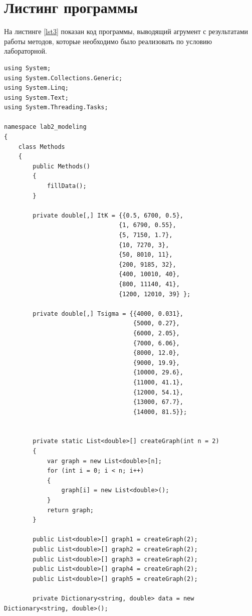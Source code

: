 \chapter{Листинг программы}

На листинге \ref{lst3} показан код программы, выводящий агрумент с результатами работы методов, которые необходимо было реализовать по условию лабораторной.

\begin{lstlisting}[caption=код программы, label=lst1]
using System;
using System.Collections.Generic;
using System.Linq;
using System.Text;
using System.Threading.Tasks;

namespace lab2_modeling
{
    class Methods
    {
        public Methods()
        {
            fillData();
        }

        private double[,] ItK = {{0.5, 6700, 0.5},
                                {1, 6790, 0.55},
                                {5, 7150, 1.7},
                                {10, 7270, 3},
                                {50, 8010, 11},
                                {200, 9185, 32},
                                {400, 10010, 40},
                                {800, 11140, 41},
                                {1200, 12010, 39} };

        private double[,] Tsigma = {{4000, 0.031},
                                    {5000, 0.27},
                                    {6000, 2.05},
                                    {7000, 6.06},
                                    {8000, 12.0},
                                    {9000, 19.9},
                                    {10000, 29.6},
                                    {11000, 41.1},
                                    {12000, 54.1},
                                    {13000, 67.7},
                                    {14000, 81.5}};

        
        private static List<double>[] createGraph(int n = 2)
        {
            var graph = new List<double>[n];
            for (int i = 0; i < n; i++)
            {
                graph[i] = new List<double>();
            }
            return graph;
        }

        public List<double>[] graph1 = createGraph(2);
        public List<double>[] graph2 = createGraph(2);
        public List<double>[] graph3 = createGraph(2);
        public List<double>[] graph4 = createGraph(2);
        public List<double>[] graph5 = createGraph(2);

        private Dictionary<string, double> data = new Dictionary<string, double>();


\end{lstlisting}

